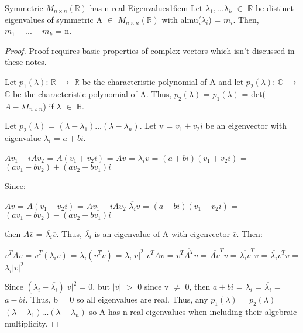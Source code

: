     \vspace{0.5cm}



    \begin{wtheorem}{Symmetric $M_{n \times n}(\mathbb{R})$ has n
    real Eigenvalues}{16cm}
        Let $\lambda_1,...\lambda_k$ $\in$ $\mathbb{R}$ be distinct
        eigenvalues of symmetric A $\in$ $M_{n \times n}(\mathbb{R})$
        with almu($\lambda_i$) = $m_i$. Then, $m_1 + ... + m_k$ = n.
    \end{wtheorem}

    \begin{proof}
        Proof requires basic properties of complex vectors
        which isn't discussed in these notes. 

        Let $p_1(\lambda)$: $\mathbb{R}$ $\rightarrow$ $\mathbb{R}$
        be the characteristic polynomial of A and
        let $p_2(\lambda)$: $\mathbb{C}$ $\rightarrow$ $\mathbb{C}$
        be the characteristic polynomial of A.
        Thus, $p_2(\lambda)$ = $p_1(\lambda)$ = det($A - \lambda I_{n \times n}$)
        if $\lambda$ $\in$ $\mathbb{R}$.

        Let $p_2(\lambda)$ = $(\lambda - \lambda_1)...(\lambda - \lambda_n)$.
        Let v = $v_1 + v_2i$ be an eigenvector with eigenvalue
        $\lambda_i$ = $a + bi$.

        \hspace{0.5cm}
        $Av_1 + iAv_2$
        = $A(v_1+v_2i)$
        = $Av$
        = $\lambda_i v$
        = $(a+bi)(v_1 + v_2i)$
        = $(av_1 - bv_2) + (av_2 + bv_1)i$

        Since:

        \hspace{0.5cm}
        $A\overline{v}$
        = $A(v_1 - v_2i)$
        = $Av_1 - iAv_2$
        \hspace{1cm}
        $\overline{\lambda_i} \overline{v}$
        = $(a-bi)(v_1 - v_2i)$
        = $(av_1 - bv_2) - (av_2 + bv_1)i$

        then $A\overline{v}$ = $\overline{\lambda_i} \overline{v}$.
        Thus, $\overline{\lambda_i}$ is an eigenvalue of A with eigenvector
        $\overline{v}$. Then:

        \hspace{0.5cm}
        $\overline{v}^T Av$
        = $\overline{v}^T (\lambda_i v)$
        = $\lambda_i(\overline{v}^T v)$
        = $\lambda_i |v|^2$
        \hspace{0.5cm}
        $\overline{v}^T Av$
        = $\overline{v}^T \overline{A^T} v$
        = $\overline{Av}^T v$
        = $\overline{\lambda_i v}^T v$
        = $\overline{\lambda_i} \overline{v}^T v$
        = $\overline{\lambda_i} |v|^2$

        Since $(\lambda_i - \overline{\lambda_i})|v|^2$ = 0,
        but $|v|$ $>$ 0 since v $\not =$ 0, then
        $a+bi$ = $\lambda_i$ = $\overline{\lambda_i}$ = $a-bi$.
        Thus, b = 0 so all eigenvalues are real.
        Thus, any $p_1(\lambda)$ = $p_2(\lambda)$
        = $(\lambda - \lambda_1)...(\lambda - \lambda_n)$
        so A has n real eigenvalues when including their algebraic multiplicity.
    \end{proof}

